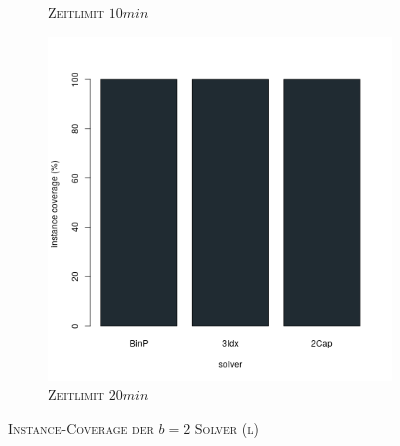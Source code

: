 \begin{figure}[H]
\begin{subfigure}[b]{0.3\textwidth}
\caption{\textsc{Zeitlimit} $10min$}
\label{fig:instance_cov_b=2_l_b}
\end{subfigure}
\hfill
\begin{subfigure}[b]{0.3\textwidth}
\centering
\includegraphics[width=1.2\textwidth]{img/solver_instance_coverage_b=2_l_1200s.png}
\caption{\textsc{Zeitlimit} $20min$}
\label{fig:instance_cov_b=2_l_c}
\end{subfigure}

\caption{\textsc{Instance-Coverage der $b=2$ Solver (l)}}
\label{fig:instance_cov_b=2_l}
\end{figure}

